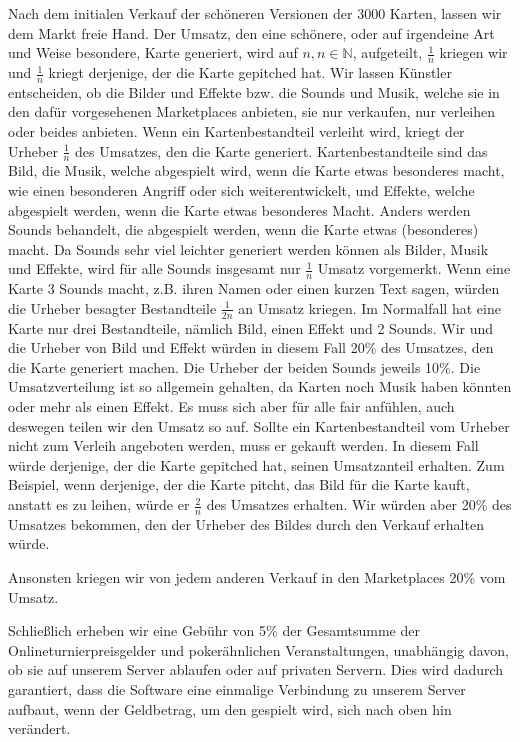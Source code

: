 \documentclass[fontsize=11, a4aper]{scrartcl}
\begin{document}
Nach dem initialen Verkauf der schöneren Versionen der 3000 Karten, lassen wir dem Markt freie Hand. Der Umsatz, den eine schönere, oder auf irgendeine Art und Weise besondere, Karte generiert, wird auf \(n, n \in \mathbb{N}\), aufgeteilt, \(\frac{1}{n}\) kriegen wir und \(\frac{1}{n}\) kriegt derjenige, der die Karte gepitched hat. Wir lassen Künstler entscheiden, ob die Bilder und Effekte bzw. die Sounds und Musik, welche sie in den dafür vorgesehenen Marketplaces anbieten, sie nur verkaufen, nur verleihen oder beides anbieten. Wenn ein Kartenbestandteil verleiht wird, kriegt der Urheber \(\frac{1}{n}\) des Umsatzes, den die Karte generiert. Kartenbestandteile sind das Bild, die Musik, welche abgespielt wird, wenn die Karte etwas besonderes macht, wie einen besonderen Angriff oder sich weiterentwickelt, und Effekte, welche abgespielt werden, wenn die Karte etwas besonderes Macht. Anders werden Sounds behandelt, die abgespielt werden, wenn die Karte etwas (besonderes) macht. Da Sounds sehr viel leichter generiert werden können als Bilder, Musik und Effekte, wird für alle Sounds insgesamt nur \(\frac{1}{n}\) Umsatz vorgemerkt. Wenn eine Karte 3 Sounds macht, z.B. ihren Namen oder einen kurzen Text sagen, würden die Urheber besagter Bestandteile \(\frac{1}{2n}\) an Umsatz kriegen. Im Normalfall hat eine Karte nur drei Bestandteile, nämlich Bild, einen Effekt und 2 Sounds. Wir und die Urheber von Bild und Effekt würden in diesem Fall 20\% des Umsatzes, den die Karte generiert machen. Die Urheber der beiden Sounds jeweils 10\%. Die Umsatzverteilung ist so allgemein gehalten, da Karten noch Musik haben könnten oder mehr als einen Effekt. Es muss sich aber für alle fair anfühlen, auch deswegen teilen wir den Umsatz so auf. Sollte ein Kartenbestandteil vom Urheber nicht zum Verleih angeboten werden, muss er gekauft werden. In diesem Fall würde derjenige, der die Karte gepitched hat, seinen Umsatzanteil erhalten. Zum Beispiel, wenn derjenige, der die Karte pitcht, das Bild für die Karte kauft, anstatt es zu leihen, würde er \(\frac{2}{n}\) des Umsatzes erhalten. Wir würden aber 20\% des Umsatzes bekommen, den der Urheber des Bildes durch den Verkauf erhalten würde.\hfill\newline

\noindent Ansonsten kriegen wir von jedem anderen Verkauf in den Marketplaces 20\% vom Umsatz.\hfill\newline

\noindent Schließlich erheben wir eine Gebühr von 5\% der Gesamtsumme der Onlineturnierpreisgelder und pokerähnlichen Veranstaltungen, unabhängig davon, ob sie auf unserem Server ablaufen oder auf privaten Servern. Dies wird dadurch garantiert, dass die Software eine einmalige Verbindung zu unserem Server aufbaut, wenn der Geldbetrag, um den gespielt wird, sich nach oben hin verändert.
\end{document}

